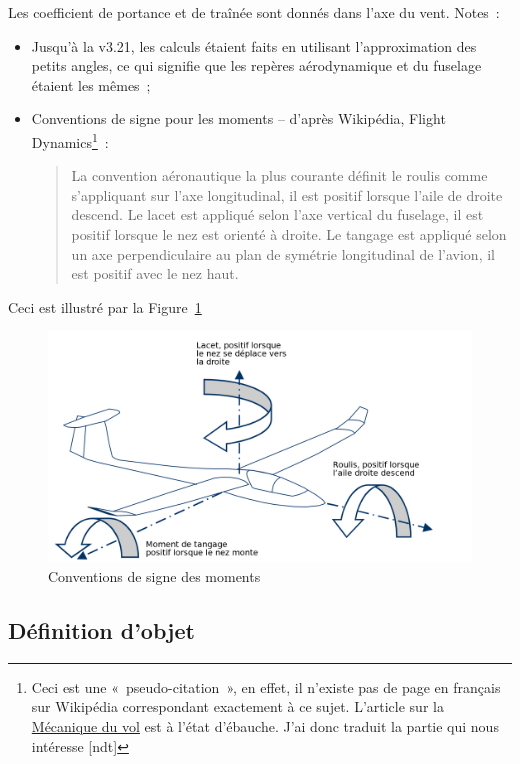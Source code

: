 \documentclass[a4paper,twoside,12pt,dvips]{article}
\begin{document}
Les coefficient de portance et de traînée sont donnés dans l’axe du vent.
Notes~:
\begin{itemize}
	\item Jusqu’à la v3.21, les calculs étaient faits en utilisant 
	l’approximation des petits angles, ce qui signifie que les repères
	aérodynamique et du fuselage étaient les mêmes~;
	\item Conventions de signe pour les moments – d’après Wikipédia, Flight
	Dynamics\footnote{Ceci est une «~pseudo-citation~», en effet, il n’existe 
	pas de page en français sur Wikipédia correspondant exactement à ce sujet.
	L’article sur la \href{https://fr.wikipedia.org/wiki/Mécanique_du_vol}
	{Mécanique du vol} est à l’état d’ébauche. J’ai donc traduit la partie qui
	nous intéresse [ndt]}~:
	\begin{quotation}
		La convention aéronautique la plus courante définit le roulis comme 
		s’appliquant sur l’axe longitudinal, il est positif lorsque l’aile de
		droite descend. Le lacet est appliqué selon l’axe vertical du fuselage,
		il est positif lorsque le nez est orienté à droite. Le tangage est 
		appliqué  selon un axe perpendiculaire au plan de symétrie longitudinal
		de l’avion, il est positif avec le nez haut.
	\end{quotation}
\end{itemize}

Ceci est illustré par la Figure~\ref{img:conventions_signe_moments}

\begin{figure}[htbp]
	\centering
	\includegraphics[width=0.8\linewidth]{img-06-fr}
	\caption{Conventions de signe des moments}
	\label{img:conventions_signe_moments}
\end{figure}

\clearpage
\subsection{Définition d’objet}
\end{document}
